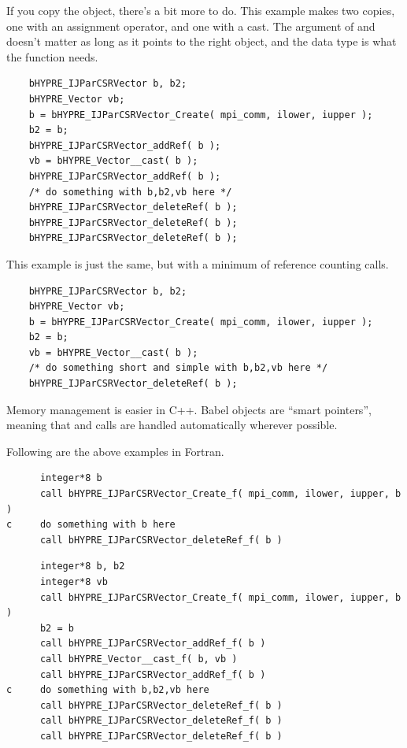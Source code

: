 If you copy the object, there's a bit more to do.  This example makes
two copies, one with an assignment operator, and one with a cast.  The
argument of  and  doesn't matter as long
as it points to the right object, and the data type is what the
function needs.

\begin{verbatim}
    bHYPRE_IJParCSRVector b, b2;
    bHYPRE_Vector vb;
    b = bHYPRE_IJParCSRVector_Create( mpi_comm, ilower, iupper );
    b2 = b;
    bHYPRE_IJParCSRVector_addRef( b );
    vb = bHYPRE_Vector__cast( b );
    bHYPRE_IJParCSRVector_addRef( b );
    /* do something with b,b2,vb here */
    bHYPRE_IJParCSRVector_deleteRef( b );
    bHYPRE_IJParCSRVector_deleteRef( b );
    bHYPRE_IJParCSRVector_deleteRef( b );
\end{verbatim}

This example is just the same, but with a minimum of reference
counting calls.
\begin{verbatim}
    bHYPRE_IJParCSRVector b, b2;
    bHYPRE_Vector vb;
    b = bHYPRE_IJParCSRVector_Create( mpi_comm, ilower, iupper );
    b2 = b;
    vb = bHYPRE_Vector__cast( b );
    /* do something short and simple with b,b2,vb here */
    bHYPRE_IJParCSRVector_deleteRef( b );
\end{verbatim}



Memory management is easier in C++.  Babel objects are ``smart
pointers'', meaning that  and  calls are
handled automatically wherever possible.

Following are the above examples in Fortran.

\begin{verbatim}
      integer*8 b
      call bHYPRE_IJParCSRVector_Create_f( mpi_comm, ilower, iupper, b )
c     do something with b here
      call bHYPRE_IJParCSRVector_deleteRef_f( b )
\end{verbatim}

\begin{verbatim}
      integer*8 b, b2
      integer*8 vb
      call bHYPRE_IJParCSRVector_Create_f( mpi_comm, ilower, iupper, b )
      b2 = b
      call bHYPRE_IJParCSRVector_addRef_f( b )
      call bHYPRE_Vector__cast_f( b, vb )
      call bHYPRE_IJParCSRVector_addRef_f( b )
c     do something with b,b2,vb here
      call bHYPRE_IJParCSRVector_deleteRef_f( b )
      call bHYPRE_IJParCSRVector_deleteRef_f( b )
      call bHYPRE_IJParCSRVector_deleteRef_f( b )
\end{verbatim}

